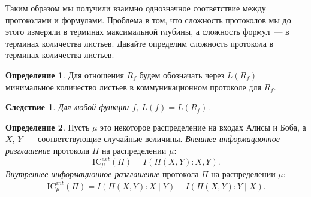 \documentclass[12pt]{article}
\newcommand{\IC}{\mathrm{IC}}
\theoremstyle{definition}
\newtheorem{definition}{Определение}[section]
\theoremstyle{plain}
\newtheorem{statement}{Утверждение}[section]
\newtheorem{corollary}{Следствие}[section]
\theoremstyle{remark}
\begin{document}
Таким образом мы получили взаимно однозначное соответствие между протоколами и формулами.
Проблема в том, что сложность протоколов мы до этого измеряли в терминах максимальной 
глубины, а сложность формул~--- в терминах количества листьев. Давайте определим сложность
протокола в терминах количества листьев.

\begin{definition}
    Для отношения $R_f$ будем обозначать через $L(R_f)$ минимальное количество
    листьев в коммуникационном протоколе для $R_f$.
\end{definition}

\begin{corollary}
    Для любой функции $f$, $L(f) = L(R_f)$.
\end{corollary}


\begin{definition}
    Пусть $\mu$ это некоторое распределение на входах Алисы и Боба,
    а $X$, $Y$~--- соответствующие случайные величины.
    \emph{Внешнее информационное разглашение} протокола $\Pi$ на распределении $\mu$:
    $$\IC_\mu^{ext}(\Pi) = I(\Pi(X,Y) : X, Y).$$
    \emph{Внутреннее информационное разглашение} протокола $\Pi$ на распределении $\mu$:
    $$\IC_\mu^{int}(\Pi) = I(\Pi(X,Y) : X \mid  Y) + I(\Pi(X,Y) : Y \mid X).$$
\end{definition}
\end{document}
